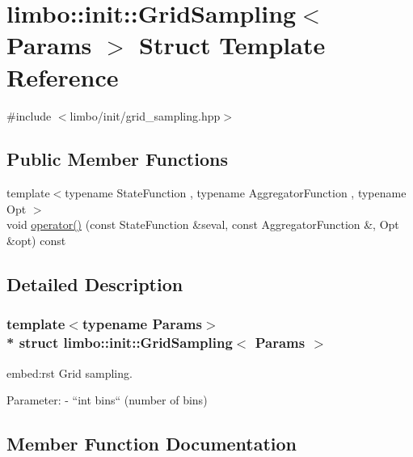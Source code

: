 \hypertarget{structlimbo_1_1init_1_1_grid_sampling}{}\section{limbo\+:\+:init\+:\+:Grid\+Sampling$<$ Params $>$ Struct Template Reference}
\label{structlimbo_1_1init_1_1_grid_sampling}


{\ttfamily \#include $<$limbo/init/grid\+\_\+sampling.\+hpp$>$}

\subsection*{Public Member Functions}
\begin{DoxyCompactItemize}
\item 
{\footnotesize template$<$typename State\+Function , typename Aggregator\+Function , typename Opt $>$ }\\void \hyperlink{structlimbo_1_1init_1_1_grid_sampling_a9b17fba72e1ae09a3361e9dcb8ff3fe3}{operator()} (const State\+Function \&seval, const Aggregator\+Function \&, Opt \&opt) const 
\end{DoxyCompactItemize}


\subsection{Detailed Description}
\subsubsection*{template$<$typename Params$>$\\*
struct limbo\+::init\+::\+Grid\+Sampling$<$ Params $>$}

\begin{DoxyVerb}embed:rst
Grid sampling.

Parameter:
  - ``int bins`` (number of bins)
\end{DoxyVerb}
 

\subsection{Member Function Documentation}
